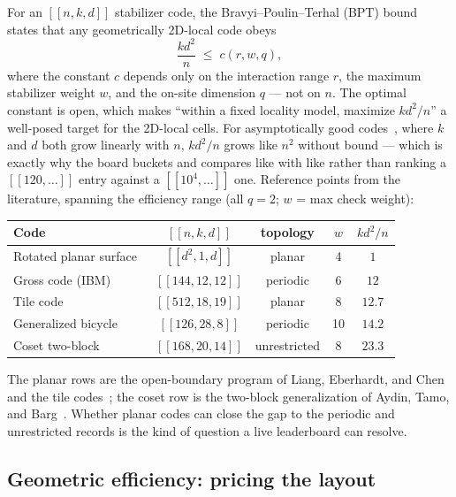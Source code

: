\documentclass[11pt]{article}
\newcommand{\eff}{kd^2/n}
\begin{document}
	For an $[[n,k,d]]$ stabilizer code, the Bravyi--Poulin--Terhal (BPT) bound~\cite{bravyi2010tradeoffs}
	states that any geometrically 2D-local code obeys
	\begin{equation}
		\frac{kd^2}{n} \;\le\; c(r,w,q),
		\label{eq:bpt}
	\end{equation}
	where the constant $c$ depends only on the interaction range $r$, the
	maximum stabilizer weight $w$, and the on-site dimension $q$ --- not on
	$n$. The optimal constant is open, which makes ``within a fixed locality
	model, maximize $\eff$'' a well-posed target for the 2D-local cells. For
	asymptotically good codes~\cite{panteleev2022asymptotically,tillich2014quantum}, where $k$ and $d$ both grow linearly with $n$,
	$\eff$ grows like $n^2$ without bound --- which is exactly why the board
	buckets and compares like with like rather than ranking a
	$[[120,\dots]]$ entry against a $[[10^4,\dots]]$ one. Reference points
	from the literature, spanning the efficiency range (all $q=2$; $w$ = max
	check weight):
	\begin{center}
		\begin{tabular}{lcccc}
			\toprule
			Code & $[[n,k,d]]$ & topology & $w$ & $\eff$\\
			\midrule
			Rotated planar surface~\cite{kitaev2003fault} & $[[d^2,1,d]]$ & planar & 4  & $1$\\
			Gross code (IBM)~\cite{bravyi2024high} & $[[144,12,12]]$ & periodic & 6  & $12$\\
			Tile code~\cite{steffan2025tile} & $[[512,18,19]]$ & planar & 8  & $12.7$\\
			Generalized bicycle~\cite{panteleev2021degenerate} & $[[126,28,8]]$ & periodic & 10 & $14.2$\\
			Coset two-block~\cite{aydin2026breaking} & $[[168,20,14]]$ & unrestricted & 8  & $23.3$\\
			\bottomrule
		\end{tabular}
	\end{center}
	The planar rows are the open-boundary program of Liang, Eberhardt, and
	Chen~\cite{liang2025planar} and the tile codes~\cite{steffan2025tile};
	the coset row is the two-block generalization of Aydin, Tamo, and
	Barg~\cite{aydin2026breaking}. Whether planar codes can close the gap to the periodic
	and unrestricted records is the kind of question a live leaderboard can
	resolve.

	\subsection{Geometric efficiency: pricing the layout}
	\label{sec:geff}
\end{document}
